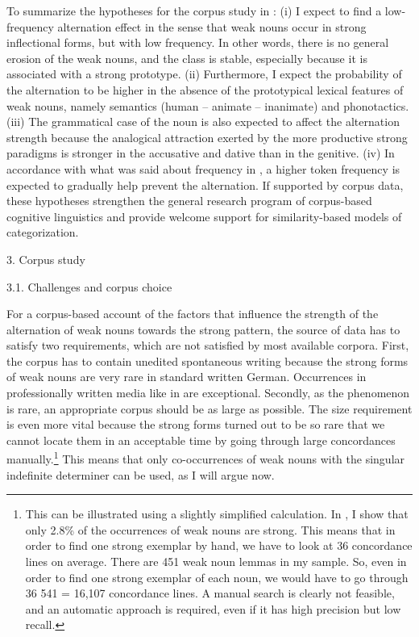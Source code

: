 \begin{styleMoutonText}
To summarize the hypotheses for the corpus study in : (i) I expect to find a low-frequency alternation effect in the sense that weak nouns occur in strong inflectional forms, but with low frequency. In other words, there is no general erosion of the weak nouns, and the class is stable, especially because it is associated with a strong prototype. (ii) Furthermore, I expect the probability of the alternation to be higher in the absence of the prototypical lexical features of weak nouns, namely semantics (human – animate – inanimate) and phonotactics. (iii) The grammatical case of the noun is also expected to affect the alternation strength because the analogical attraction exerted by the more productive strong paradigms is stronger in the accusative and dative than in the genitive. (iv) In accordance with what was said about frequency in , a higher token frequency is expected to gradually help prevent the alternation. If supported by corpus data, these hypotheses strengthen the general research program of corpus-based cognitive linguistics and provide welcome support for similarity-based models of categorization.
\end{styleMoutonText}

\begin{styleMoutonHeadingi}
3. Corpus study
\end{styleMoutonHeadingi}

\begin{styleMoutonHeadingii}
3.1. Challenges and corpus choice
\end{styleMoutonHeadingii}

\begin{styleMoutonText}
For a corpus-based account of the factors that influence the strength of the alternation of weak nouns towards the strong pattern, the source of data has to satisfy two requirements, which are not satisfied by most available corpora. First, the corpus has to contain unedited spontaneous writing because the strong forms of weak nouns are very rare in standard written German. Occurrences in professionally written media like  in  are exceptional. Secondly, as the phenomenon is rare, an appropriate corpus should be as large as possible. The size requirement is even more vital because the strong forms turned out to be so rare that we cannot locate them in an acceptable time by going through large concordances manually.\footnote{This can be illustrated using a slightly simplified calculation. In , I show that only 2.8\% of the occurrences of weak nouns are strong. This means that in order to find one strong exemplar by hand, we have to look at 36 concordance lines on average. There are 451 weak noun lemmas in my sample. So, even in order to find one strong exemplar of each noun, we would have to go through 36 {\textbullet} 541 = 16,107 concordance lines. A manual search is clearly not feasible, and an automatic approach is required, even if it has high precision but low recall.} This means that only co-occurrences of weak nouns with the singular indefinite determiner can be used, as I will argue now.
\end{styleMoutonText}

